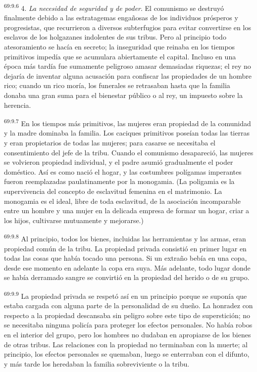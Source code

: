 \documentclass[twoside, 11pt]{book}
\begin{document}
\par
\textsuperscript{69:9.6} 4. \textit{La necesidad de seguridad y de poder}. El comunismo se destruyó finalmente debido a las estratagemas engañosas de los individuos prósperos y progresistas, que recurrieron a diversos subterfugios para evitar convertirse en los esclavos de los holgazanes indolentes de sus tribus. Pero al principio todo atesoramiento se hacía en secreto; la inseguridad que reinaba en los tiempos primitivos impedía que se acumulara abiertamente el capital. Incluso en una época más tardía fue sumamente peligroso amasar demasiadas riquezas; el rey no dejaría de inventar alguna acusación para confiscar las propiedades de un hombre rico; cuando un rico moría, los funerales se retrasaban hasta que la familia donaba una gran suma para el bienestar público o al rey, un impuesto sobre la herencia.

\par
\textsuperscript{69:9.7} En los tiempos más primitivos, las mujeres eran propiedad de la comunidad y la madre dominaba la familia. Los caciques primitivos poseían todas las tierras y eran propietarios de todas las mujeres; para casarse se necesitaba el consentimiento del jefe de la tribu. Cuando el comunismo desapareció, las mujeres se volvieron propiedad individual, y el padre asumió gradualmente el poder doméstico. Así es como nació el hogar, y las costumbres polígamas imperantes fueron reemplazadas paulatinamente por la monogamia. (La poligamia es la supervivencia del concepto de esclavitud femenina en el matrimonio. La monogamia es el ideal, libre de toda esclavitud, de la asociación incomparable entre un hombre y una mujer en la delicada empresa de formar un hogar, criar a los hijos, cultivarse mutuamente y mejorarse.)

\par
\textsuperscript{69:9.8} Al principio, todos los bienes, incluidas las herramientas y las armas, eran propiedad común de la tribu. La propiedad privada consistió en primer lugar en todas las cosas que había tocado una persona. Si un extraño bebía en una copa, desde ese momento en adelante la copa era suya. Más adelante, todo lugar donde se había derramado sangre se convirtió en la propiedad del herido o de su grupo.

\par
\textsuperscript{69:9.9} La propiedad privada se respetó así en un principio porque se suponía que estaba cargada con alguna parte de la personalidad de su dueño. La honradez con respecto a la propiedad descansaba sin peligro sobre este tipo de superstición; no se necesitaba ninguna policía para proteger los efectos personales. No había robos en el interior del grupo, pero los hombres no dudaban en apropiarse de los bienes de otras tribus. Las relaciones con la propiedad no terminaban con la muerte; al principio, los efectos personales se quemaban, luego se enterraban con el difunto, y más tarde los heredaban la familia sobreviviente o la tribu.
\end{document}
